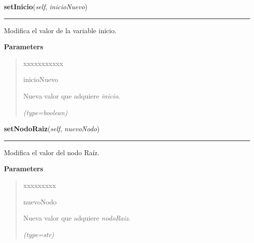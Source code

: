 \hspace{.8\funcindent}\begin{boxedminipage}{\funcwidth}

    \raggedright \textbf{setInicio}(\textit{self}, \textit{inicioNuevo})

    \vspace{-1.5ex}

    \rule{\textwidth}{0.5\fboxrule}
\setlength{\parskip}{2ex}
    Modifica el valor de la variable inicio.

\setlength{\parskip}{1ex}
      \textbf{Parameters}
      \vspace{-1ex}

      \begin{quote}
        \begin{Ventry}{xxxxxxxxxxx}

          \item[inicioNuevo]

          Nueva valor que adquiere \textit{inicio}.

            {\it (type=boolean)}

        \end{Ventry}

      \end{quote}

    \end{boxedminipage}

    \label{grafo:Grafo:setNodoRaiz}

    \vspace{0.5ex}

\hspace{.8\funcindent}\begin{boxedminipage}{\funcwidth}

    \raggedright \textbf{setNodoRaiz}(\textit{self}, \textit{nuevoNodo})

    \vspace{-1.5ex}

    \rule{\textwidth}{0.5\fboxrule}
\setlength{\parskip}{2ex}
    Modifica el valor del nodo Raíz.

\setlength{\parskip}{1ex}
      \textbf{Parameters}
      \vspace{-1ex}

      \begin{quote}
        \begin{Ventry}{xxxxxxxxx}

          \item[nuevoNodo]

          Nueva valor que adquiere \textit{nodoRaiz}.

            {\it (type=str)}

        \end{Ventry}

      \end{quote}

    \end{boxedminipage}


